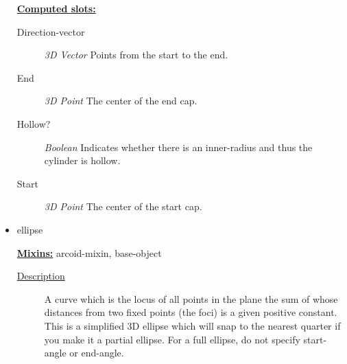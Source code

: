 \documentclass [11pt]{book}
\begin{document}
\begin{itemize}
\begin{description}
\end{description}






\textbf{
\underline{Computed slots:}}

\begin{description}

\item [Direction-vector]
\emph{3D Vector} Points from the start to the end.


\item [End]
\emph{3D Point} The center of the end cap.


\item [Hollow?]
\emph{Boolean} Indicates whether there is an inner-radius and thus the cylinder is hollow.


\item [Start]
\emph{3D Point} The center of the start cap.


\end{description}







\item {}ellipse


\textbf{
\underline{Mixins:}} arcoid-mixin, base-object





\begin{description}

\item [
\underline{Description}]


A curve which is the locus of all points in the plane 
the sum of whose distances from two fixed points (the foci) is a given positive constant.
This is a simplified 3D ellipse which will snap to the nearest quarter if you make it a 
partial ellipse. For a full ellipse, do not specify start-angle or end-angle.



\end{description}




\begin{figure}
\begin{lrbox}{\boxedverb}
\begin{minipage}{\linewidth}
{\small

}
\end{minipage}
\end{lrbox}
\end{figure}
\end{itemize}
\end{document}
